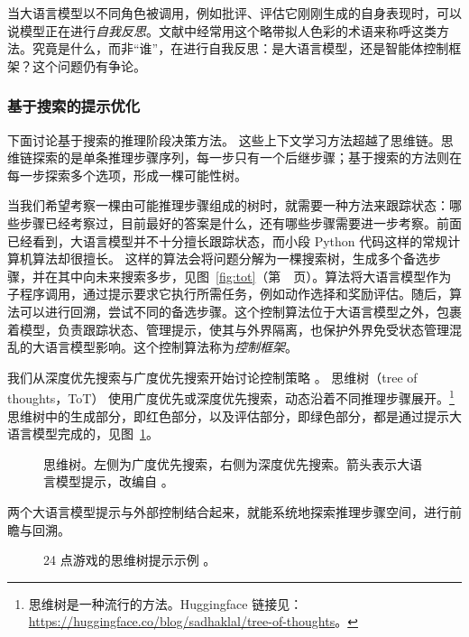 当大语言模型以不同角色被调用，例如批评、评估它刚刚生成的自身表现时，可以说模型正在进行{\em 自我反思}。文献中经常用这个略带拟人色彩的术语来称呼这类方法。究竟是什么，而非“谁”，在进行自我反思：是大语言模型，还是智能体控制框架？这个问题仍有争论。

\subsubsection{基于搜索的提示优化}\label{sec:planning}
下面讨论基于搜索的推理阶段决策方法。
这些上下文学习方法超越了思维链。思维链探索的是单条推理步骤序列，每一步只有一个后继步骤；基于搜索的方法则在每一步探索多个选项，形成一棵可能性树。

当我们希望考察一棵由可能推理步骤组成的树时，就需要一种方法来跟踪状态：哪些步骤已经考察过，目前最好的答案是什么，还有哪些步骤需要进一步考察。前面已经看到，大语言模型并不十分擅长跟踪状态，而小段 Python 代码这样的常规计算机算法却很擅长。
这样的算法会将问题分解为一棵搜索树，生成多个备选步骤，并在其中向未来搜索多步，见图~\ref{fig:tot}（第~\pageref{fig:tot}~页）。算法将大语言模型作为子程序调用，通过提示要求它执行所需任务，例如动作选择和奖励评估。随后，算法可以进行回溯，尝试不同的备选步骤。这个控制算法位于大语言模型之外，包裹着模型，负责跟踪状态、管理提示，使其与外界隔离，也保护外界免受状态管理混乱的大语言模型影响。这个控制算法称为{\em 控制框架}。

我们从深度优先搜索与广度优先搜索开始讨论控制策略 \citep{cormen2022introduction}。
\label{sec:buffer}
思维树（tree of thoughts，ToT）\citep{yao2024tree} 使用广度优先或深度优先搜索，动态沿着不同推理步骤展开。\footnote{思维树是一种流行的方法。Huggingface 链接见：\url{https://huggingface.co/blog/sadhaklal/tree-of-thoughts}。}
思维树中的生成部分，即红色部分，以及评估部分，即绿色部分，都是通过提示大语言模型完成的，见图~\ref{fig:totcode}。
\begin{figure}
  \begin{center}
    
    \caption{思维树。左侧为广度优先搜索，右侧为深度优先搜索。箭头表示大语言模型提示，改编自 \citep{yao2024tree}。} \label{fig:totcode}
  \end{center}
\end{figure}
两个大语言模型提示与外部控制结合起来，就能系统地探索推理步骤空间，进行前瞻与回溯。

\begin{figure}
  \begin{center}
    
    \caption{24 点游戏的思维树提示示例 \citep{yao2024tree}。} \label{fig:tot-ex}
  \end{center}
\end{figure}

